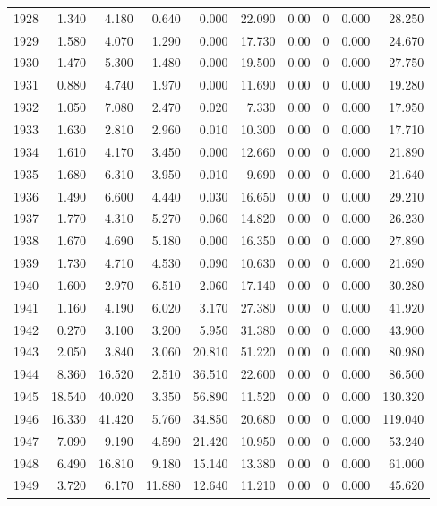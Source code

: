 \documentclass[
]{scrartcl}
\begin{document}
\begin{longtable}{rrrrrrrrrr}
1928 & 1.340 & 4.180 & 0.640 & 0.000 & 22.090 & 0.00 & 0 & 0.000 & 28.250 \\ 
1929 & 1.580 & 4.070 & 1.290 & 0.000 & 17.730 & 0.00 & 0 & 0.000 & 24.670 \\ 
1930 & 1.470 & 5.300 & 1.480 & 0.000 & 19.500 & 0.00 & 0 & 0.000 & 27.750 \\ 
1931 & 0.880 & 4.740 & 1.970 & 0.000 & 11.690 & 0.00 & 0 & 0.000 & 19.280 \\ 
1932 & 1.050 & 7.080 & 2.470 & 0.020 & 7.330 & 0.00 & 0 & 0.000 & 17.950 \\ 
1933 & 1.630 & 2.810 & 2.960 & 0.010 & 10.300 & 0.00 & 0 & 0.000 & 17.710 \\ 
1934 & 1.610 & 4.170 & 3.450 & 0.000 & 12.660 & 0.00 & 0 & 0.000 & 21.890 \\ 
1935 & 1.680 & 6.310 & 3.950 & 0.010 & 9.690 & 0.00 & 0 & 0.000 & 21.640 \\ 
1936 & 1.490 & 6.600 & 4.440 & 0.030 & 16.650 & 0.00 & 0 & 0.000 & 29.210 \\ 
1937 & 1.770 & 4.310 & 5.270 & 0.060 & 14.820 & 0.00 & 0 & 0.000 & 26.230 \\ 
1938 & 1.670 & 4.690 & 5.180 & 0.000 & 16.350 & 0.00 & 0 & 0.000 & 27.890 \\ 
1939 & 1.730 & 4.710 & 4.530 & 0.090 & 10.630 & 0.00 & 0 & 0.000 & 21.690 \\ 
1940 & 1.600 & 2.970 & 6.510 & 2.060 & 17.140 & 0.00 & 0 & 0.000 & 30.280 \\ 
1941 & 1.160 & 4.190 & 6.020 & 3.170 & 27.380 & 0.00 & 0 & 0.000 & 41.920 \\ 
1942 & 0.270 & 3.100 & 3.200 & 5.950 & 31.380 & 0.00 & 0 & 0.000 & 43.900 \\ 
1943 & 2.050 & 3.840 & 3.060 & 20.810 & 51.220 & 0.00 & 0 & 0.000 & 80.980 \\ 
1944 & 8.360 & 16.520 & 2.510 & 36.510 & 22.600 & 0.00 & 0 & 0.000 & 86.500 \\ 
1945 & 18.540 & 40.020 & 3.350 & 56.890 & 11.520 & 0.00 & 0 & 0.000 & 130.320 \\ 
1946 & 16.330 & 41.420 & 5.760 & 34.850 & 20.680 & 0.00 & 0 & 0.000 & 119.040 \\ 
1947 & 7.090 & 9.190 & 4.590 & 21.420 & 10.950 & 0.00 & 0 & 0.000 & 53.240 \\ 
1948 & 6.490 & 16.810 & 9.180 & 15.140 & 13.380 & 0.00 & 0 & 0.000 & 61.000 \\ 
1949 & 3.720 & 6.170 & 11.880 & 12.640 & 11.210 & 0.00 & 0 & 0.000 & 45.620 \\ 

\end{longtable}
\end{document}
